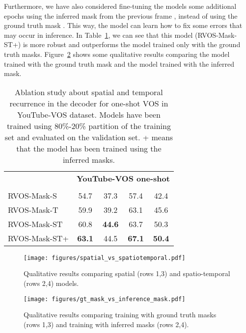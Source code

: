 \documentclass[10pt,twocolumn,letterpaper]{article}
\begin{document}
Furthermore, we have also considered fine-tuning the models some additional epochs using the inferred mask from the previous frame , instead of using the ground truth mask . This way, the model can learn how to fix some errors that may occur in inference. In Table~\ref{tab:oneshot_youtube_ablation}, we can see that this model (RVOS-Mask-ST+) is more robust and outperforms the model trained only with the ground truth masks. Figure~\ref{fig:gtmask-inferencemask-comparison} shows some qualitative results comparing the model trained with the ground truth mask and the model trained with the inferred mask.


\begin{table}[]
\centering
\begin{tabular}{@{}lcccc@{}}
\toprule
\multicolumn{1}{c}{}  &  \multicolumn{4}{c}{\textbf{YouTube-VOS one-shot}} \\
    &     &    &       &   \\  
\midrule
RVOS-Mask-S                              & 54.7    & 37.3    & 57.4 & 42.4 \\
RVOS-Mask-T                              & 59.9    & 39.2    & 63.1 & 45.6 \\
RVOS-Mask-ST                             & 60.8    & \textbf{44.6}    & 63.7 & 50.3 \\
RVOS-Mask-ST+                            & \textbf{63.1}    & 44.5    & \textbf{67.1} & \textbf{50.4} \\
\bottomrule
\end{tabular}
\caption{Ablation study about spatial and temporal recurrence in the decoder for one-shot VOS in YouTube-VOS dataset. Models have been trained using 80\%-20\% partition of the training set and evaluated on the validation set. + means that the model has been trained using the inferred masks.}
\label{tab:oneshot_youtube_ablation}
\end{table}

\begin{figure}
    \centering
    \texttt{[image: figures/spatial\_vs\_spatiotemporal.pdf]}
\caption{Qualitative results comparing spatial (rows 1,3) and spatio-temporal (rows 2,4) models.}
\label{fig:spatial-spatiotemporal-comparison}
\end{figure}

\begin{figure}
    \centering
    \texttt{[image: figures/gt\_mask\_vs\_inference\_mask.pdf]}
\caption{Qualitative results comparing training with ground truth masks (rows 1,3) and training with inferred masks (rows 2,4).}
\label{fig:gtmask-inferencemask-comparison}
\end{figure}
\end{document}
